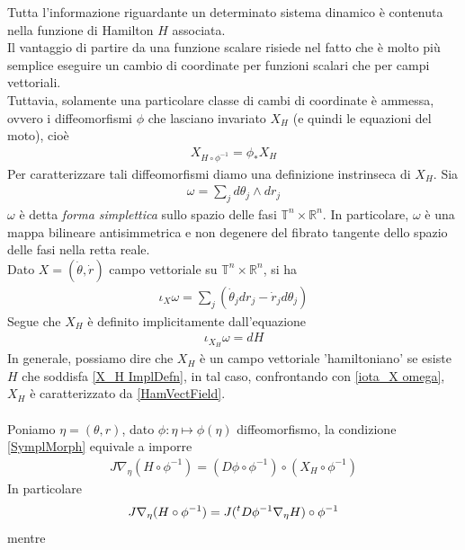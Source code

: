 \documentclass[twoside, 11pt]{amsbook}
\newcommand{\0}{{(0)}}
\newcommand{\3}{{(3)}}
\theoremstyle{colonplain}
\theoremstyle{colondefinition}
\theoremstyle{colonremark}
\numberwithin{equation}{chapter}
\begin{document}
Tutta l'informazione riguardante un determinato sistema dinamico è contenuta nella funzione di Hamilton $H$ associata. \\
Il vantaggio di partire da una funzione scalare risiede nel fatto che è molto più semplice eseguire un cambio di coordinate per funzioni scalari che per campi vettoriali. \\
Tuttavia, solamente una particolare classe di cambi di coordinate è ammessa, ovvero i diffeomorfismi $\phi$ che lasciano invariato $X_H$ (e quindi le equazioni del moto), cioè
\begin{align}\label{SymplMorph}
    X_{H \circ \phi^{-1}} = \phi_*X_H 
\end{align}
Per caratterizzare tali diffeomorfismi diamo una definizione instrinseca di $X_H$. Sia
\begin{align}
    \omega = \sum_j d\theta_j \wedge dr_j 
\end{align}
$\omega$ è detta \textit{forma simplettica} sullo spazio delle fasi $\mathbb{T}^n \times \mathbb{R}^n$. In particolare, $\omega$ è una mappa bilineare antisimmetrica e non degenere del fibrato tangente dello spazio delle fasi nella retta reale. \\
Dato $X = (\dot{\theta}, \dot{r})$ campo vettoriale su $\mathbb{T}^n \times \mathbb{R}^n$, si ha
\begin{align}\label{iota_X omega}
    \iota_X\omega = \sum_j (\dot{\theta}_jdr_j - \dot{r}_jd\theta_j) 
\end{align}
Segue che $X_H$ è definito implicitamente dall'equazione
\begin{align}\label{X_H ImplDefn}
    \iota_{X_H}\omega = dH 
\end{align}
In generale, possiamo dire che $X_H$ è un campo vettoriale 'hamiltoniano' se esiste $H$ che soddisfa \eqref{X_H ImplDefn}, in tal caso, confrontando con \eqref{iota_X omega}, $X_H$ è caratterizzato da \eqref{HamVectField}. \\ \\
Poniamo $\eta = (\theta, r)$, dato $\phi : \eta \mapsto \phi(\eta)$ diffeomorfismo, la condizione \eqref{SymplMorph} equivale a imporre
\begin{align}
    J\nabla_\eta(H \circ \phi^{-1}) = (D\phi \circ \phi^{-1}) \circ (X_{H} \circ \phi^{-1})
\end{align}
In particolare
\begin{align}
    J\nabla_\eta(H \circ \phi^{-1}) = J(\null^t D\phi^{-1}\nabla_\eta H) \circ \phi^{-1}
\end{align}
mentre
\end{document}
